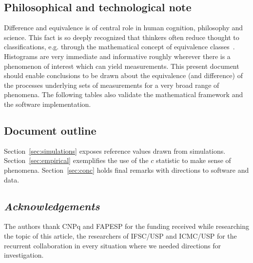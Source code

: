 \documentclass[12pt,fleqn]{article}
\begin{document}




\subsection{Philosophical and technological note}
Difference and equivalence is of central role in human cognition,
philosophy and science.
This fact is so deeply recognized that thinkers often reduce
thought to classifications, e.g. through the
mathematical concept of equivalence classes~\cite{deleuze}.
Histograms are very immediate and informative
roughly wherever there is a phenomenon of interest which can yield measurements.
This present document should enable conclusions to be drawn about 
the equivalence (and difference)
of the processes underlying sets of measurements for a very
broad range of phenomena.
The following tables 
also validate the mathematical framework
and the software implementation.

\subsection{Document outline}
Section~\ref{sec:simulations} exposes reference values drawn from simulations.
Section~\ref{sec:empirical} exemplifies the use of the $c$ statistic
to make sense of phenomena.
Section~\ref{sec:conc} holds final remarks with directions to
software and data.



\subsection*{\textit{Acknowledgements}}
The authors thank CNPq and FAPESP for the funding received while researching the topic of this article,
the researchers of IFSC/USP and ICMC/USP for the recurrent collaboration in every situation
where we needed directions for investigation.
\end{document}
